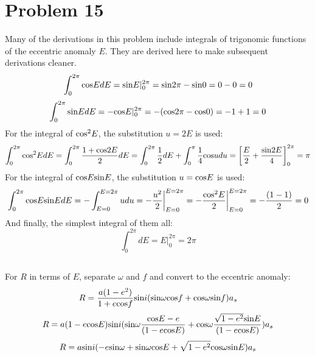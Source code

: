 \documentclass[]{aiaa-tc}%
\begin{document}
	\section{Problem 15}
Many of the derivations in this problem include integrals of trigonomic functions of the eccentric anomaly $E$. They are derived here to make subsequent derivations cleaner.
	\begin{equation}
		\int_{0}^{2\pi}\textup{cos}EdE=\textup{sin}E\rvert_{0}^{2\pi}=\textup{sin}2\pi-\textup{sin}0=0-0=0
		\label{eqn:cosInt}
	\end{equation}
	\begin{equation}
		\int_{0}^{2\pi}\textup{sin}EdE=-\textup{cos}E\rvert_{0}^{2\pi}=-(\textup{cos}2\pi-\textup{cos}0)=-1+1=0
		\label{eqn:sinInt}
	\end{equation}
For the integral of $\textup{cos}^2E$, the substitution $u=2E$ is used:
	\begin{equation}
		\int_{0}^{2\pi}\textup{cos}^2EdE=\int_{0}^{2\pi}\frac{1+ \textup{cos} 2E }{2}dE=\int_{0}^{2\pi}\frac{1}{2}dE+\int_{0}^{\pi}\frac{1}{4}\textup{cos}udu=\left [\frac{E}{2}+\frac{\textup{sin} 2E}{4}  \right ]_0^{2\pi}=\pi
		\label{eqn:cos2Int}
	\end{equation}
For the integral of $\textup{cos}E\textup{sin}E$, the substitution $u=\textup{cos}E$ is used:
	\begin{equation}
		\int_{0}^{2\pi}\textup{cos}E\textup{sin}EdE=-\int_{E=0}^{E=2\pi}udu=-\frac{u^2}{2}\bigg|_{E=0}^{E=2\pi}=-\frac{\textup{cos}^2E}{2}\bigg|_{E=0}^{E=2\pi}=-\frac{(1-1)}{2}=0
		\label{eqn:cosSinInt}
	\end{equation}
And finally, the simplest integral of them all:
	\begin{equation}
\int_{0}^{2\pi}dE=E\bigg|_0^{2\pi}=2\pi
		\label{eqn:EInt}
	\end{equation}
\subsection {}
For 
$R$ in terms of $E$, separate $\omega$ and $f$ and convert to the eccentric anomaly:
	\begin{equation}
		R = \frac{a(1-e^2)}{1+e\textup{cos}f}\textup{sin}i(\textup{sin}\omega \textup{cos}f+\textup{cos}\omega \textup{sin}f)a_s
	\end{equation}
	\begin{equation}
		R =a(1-e\textup{cos}E)\textup{sin}i(\textup{sin}\omega \frac{\textup{cos}E-e}{(1-e\textup{cos}E)}+\textup{cos}\omega \frac{\sqrt{1-e^2}\textup{sin}E}{(1-e\textup{cos}E)})a_s
	\end{equation}
	\begin{equation}
		R = a\textup{sin}i(-e\textup{sin}\omega+\textup{sin}\omega \textup{cos}E +\sqrt{1-e^2}\textup{cos}\omega\textup{sin}E )a_s
	\end{equation}
\end{document}
